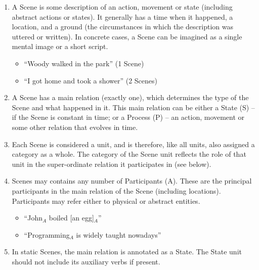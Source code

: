 \documentclass[11pt]{article}
\newcommand{\orig}[1]{{\color{red} {#1}}}
\begin{document}
\begin{enumerate}
  \item
    A Scene is some description of an action, movement or state (including abstract actions or states).
    It generally has a time when it happened, a location, and a ground (the circumstances in which the description was
    uttered or written).
    In concrete cases, a Scene can be imagined as a single mental image or a short script.
    \begin{itemize}
    \item
      ``Woody walked in the park'' (1 Scene)
    \item
      ``I got home and took a shower'' (2 Scenes)
    \end{itemize}

  \item
    A Scene has a main relation (exactly one), which determines the type of the Scene and what happened in it. This main relation can be either a {\sc State} (S) -- if the Scene is constant in time; or a {\sc Process} (P) -- an action, movement or some other relation that evolves in time.
     
  \item
    Each Scene is considered a unit, and is therefore, like all units, also assigned a category as a whole. The category of the Scene unit reflects the role of that unit in the super-ordinate relation it participates in (see below).

  \item
Scenes may contains any number of {\sc Participants} (A).  These are the principal participants in the main relation of the Scene (including locations). Participants may refer either to physical or abstract entities.

  \begin{itemize}
  \item
    ``John$_A$ boiled [an egg]$_A$''
  \item
    ``Programming$_A$ is widely taught nowadays''
  \end{itemize}

  \item
    In static Scenes, the main relation is annotated as a {\sc State}. The State unit should not include its auxiliary verbs if present.


\end{enumerate}
\end{document}
